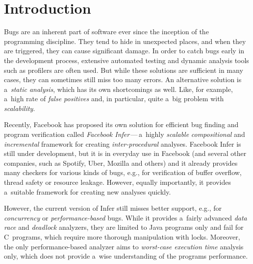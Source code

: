 \documentclass{ExcelAtFIT}
\affiliation{
    \{
    *\href{mailto:xharmi00@stud.fit.vutbr.cz}{xharmi00},
    **\href{mailto:xmarci10@stud.fit.vutbr.cz}{xmarci10},
    ***\href{mailto:xpavel34@stud.fit.vutbr.cz}{xpavel34}
    \}@stud.fit.vutbr.cz,
    \emph{Faculty of Information Technology, Brno University of Technology}
}
\begin{document}
\startdocument


\section{Introduction}
Bugs are an inherent part of software ever since
the inception of the programming discipline.
They tend to hide in unexpected places, and when
they are triggered, they can cause significant
damage. In order to catch bugs early in the
development process, extensive automated testing
and dynamic analysis tools such as profilers are
often used. But while these solutions are sufficient
in many cases, they can sometimes still miss too
many errors. An alternative solution is a~\emph{static
analysis}, which has its own shortcomings as well.
Like, for example, a~high rate of \emph{false positives}
and, in particular, quite a~big problem with
\emph{scalability}.

Recently, Facebook has proposed its own solution
for efficient bug finding and program verification
called \emph{Facebook Infer}\,---\,a~highly
\emph{scalable} \emph{compositional} and
\emph{incremental} framework for creating
\emph{inter-procedural} analyses. Facebook Infer is still
under development, but it is in everyday use in
Facebook (and several other companies, such as
Spotify, Uber, Mozilla and others) and it already
provides many checkers for various kinds of bugs,
e.g., for verification of buffer overflow, thread
safety or resource leakage. However, equally
importantly, it provides a~suitable framework
for creating new analyses quickly.

However, the current version of Infer still misses
better support, e.g., for \emph{concurrency} or
\emph{performance-based} bugs. While it provides a~fairly
advanced \emph{data race} and \emph{deadlock} analyzers,
they are limited to Java programs only and fail for
C~programs, which require more thorough manipulation with
locks. Moreover, the only performance-based analyzer aims
to \emph{worst-case execution time} analysis only,
which does not provide a~wise understanding of
the programs performance.
\end{document}

